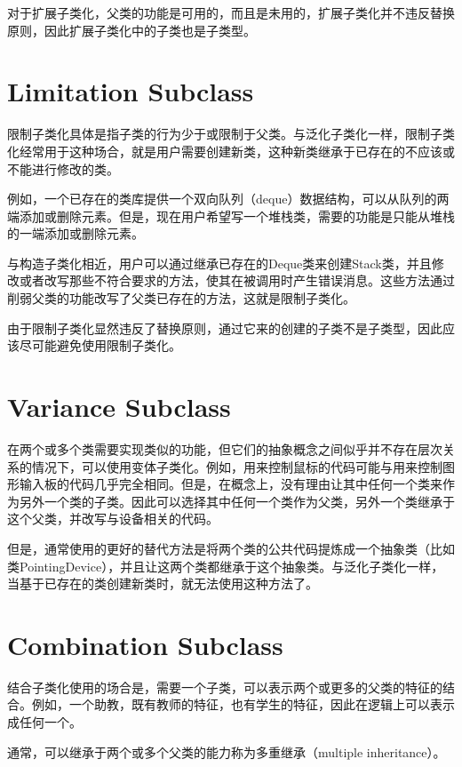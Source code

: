 对于扩展子类化，父类的功能是可用的，而且是未用的，扩展子类化并不违反替换原则，因此扩展子类化中的子类也是子类型。

\section{Limitation Subclass}

限制子类化具体是指子类的行为少于或限制于父类。与泛化子类化一样，限制子类化经常用于这种场合，就是用户需要创建新类，这种新类继承于已存在的不应该或不能进行修改的类。

例如，一个已存在的类库提供一个双向队列（deque）数据结构，可以从队列的两端添加或删除元素。但是，现在用户希望写一个堆栈类，需要的功能是只能从堆栈的一端添加或删除元素。

与构造子类化相近，用户可以通过继承已存在的Deque类来创建Stack类，并且修改或者改写那些不符合要求的方法，使其在被调用时产生错误消息。这些方法通过削弱父类的功能改写了父类已存在的方法，这就是限制子类化。

由于限制子类化显然违反了替换原则，通过它来的创建的子类不是子类型，因此应该尽可能避免使用限制子类化。


\section{Variance Subclass}



在两个或多个类需要实现类似的功能，但它们的抽象概念之间似乎并不存在层次关系的情况下，可以使用变体子类化。例如，用来控制鼠标的代码可能与用来控制图形输入板的代码几乎完全相同。但是，在概念上，没有理由让其中任何一个类来作为另外一个类的子类。因此可以选择其中任何一个类作为父类，另外一个类继承于这个父类，并改写与设备相关的代码。



但是，通常使用的更好的替代方法是将两个类的公共代码提炼成一个抽象类（比如类PointingDevice），并且让这两个类都继承于这个抽象类。与泛化子类化一样，当基于已存在的类创建新类时，就无法使用这种方法了。

\section{Combination Subclass}

结合子类化使用的场合是，需要一个子类，可以表示两个或更多的父类的特征的结合。例如，一个助教，既有教师的特征，也有学生的特征，因此在逻辑上可以表示成任何一个。

通常，可以继承于两个或多个父类的能力称为多重继承（multiple inheritance）。

